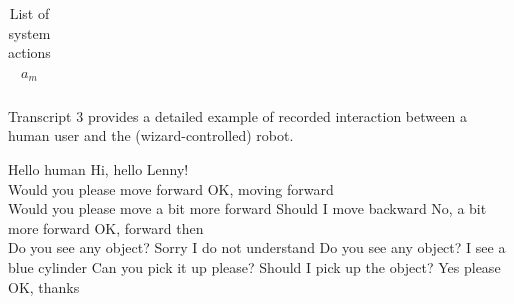 \begin{table}[p]
\begin{footnotesize}
\begin{tabular}{p{60mm}}
\end{tabular}
\end{footnotesize}
 \caption{List of system actions $a_m$} 
\label{table:systemdas_exp2}
\end{table}

Transcript 3 provides a detailed example of recorded interaction between a human user and the (wizard-controlled) robot.

\begin{Transcript}[p]
\begin{dialogue} \vspace{3mm}
 Hello human\vspace{2mm}
 Hi, hello Lenny! \vspace{1mm} \\ 
 \vspace{2mm}
 Would you please move forward\vspace{2mm}
 OK, moving forward  \vspace{1mm} \\
 \vspace{2mm}
 Would you please move a bit more forward\vspace{2mm}
 Should I move backward \vspace{2mm}
 No, a bit more forward\vspace{2mm}
 OK, forward then \vspace{1mm} \\ 
 \vspace{2mm}
 Do you see any object?\vspace{2mm}
 Sorry I do not understand\vspace{2mm}
 Do you see any object?\vspace{2mm}
 I see a blue cylinder\vspace{2mm}
 Can you pick it up please?\vspace{2mm}
 Should I pick up the object?\vspace{2mm}
 Yes please\vspace{2mm}
 OK, thanks  \vspace{1mm} \\
 \\
 \vspace{2mm}

\end{dialogue}
\end{Transcript}
